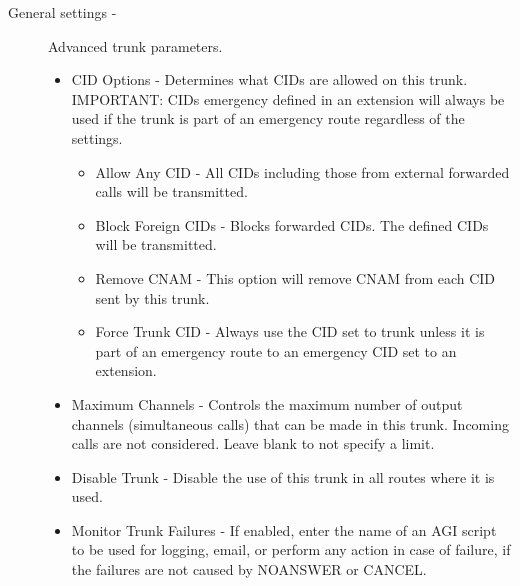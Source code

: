 \begin{description}
        \begin{description}
            \item[General settings -] Advanced trunk parameters.
                \begin{itemize}
                    \item CID Options - Determines what CIDs are allowed on this trunk. IMPORTANT: CIDs emergency defined in an extension will always be used if the trunk is part of an emergency route regardless of the settings.
                        \begin{itemize}
                            \item Allow Any CID - All CIDs including those from external forwarded calls will be transmitted.
                            \item Block Foreign CIDs - Blocks forwarded CIDs. The defined CIDs will be transmitted.
                            \item Remove CNAM - This option will remove CNAM from each CID sent by this trunk.
                            \item Force Trunk CID - Always use the CID set to trunk unless it is part of an emergency route to an emergency CID set to an extension.
                        \end{itemize}                         
                    \item Maximum Channels - Controls the maximum number of output channels (simultaneous calls) that can be made in this trunk. Incoming calls are not considered. Leave blank to not specify a limit.
                    \item Disable Trunk - Disable the use of this trunk in all routes where it is used.
                    \item Monitor Trunk Failures - If enabled, enter the name of an AGI script to be used for logging, email, or perform any action in case of failure, if the failures are not caused by NOANSWER or CANCEL.
                \end{itemize}


\end{description}
\end{description}
